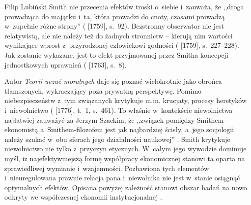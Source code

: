 \begin{artplenv}{Filip Lubiński}
Smith nie przecenia efektów troski o~siebie i~zauważa, że ,,droga prowadząca do majątku i~ta, która prowadzi do
cnoty, czasami prowadzą w~zupełnie różne strony''
(\cite{smith_teoria_1989} [1759], s.~92).
Bezstronny
obserwator nie jest relatywistą, ale nie należy też do żadnych stronnictw -- kierują nim wartości wynikające
wprost z~przyrodzonej człowiekowi godności
(\cite{smith_teoria_1989} [1759], s.~227--228).
Jak zostanie wykazane,
jest to efekt przyjmowanej przez Smitha koncepcji jednostkowych uprawnień
(\cite{smith_lectures_1982} [1763], s.~8).

Autor \textit{Teorii uczuć moralnych} daje się poznać wielokrotnie jako obrońca tłamszonych, wykraczający poza
prywatną perspektywę. Pomimo niebezpieczeństw z~tym związanych krytykuje m.in. krucjaty, procesy
heretyków i~niewolnictwo
(\cite{smith_badania_2007} [1776], t.~1, s.~461).
To właśnie w~kontekście niewolnictwa
najłatwiej zauważyć za Jerzym Szackim, że ,,związek pomiędzy Smithem-ekonomistą a~Smithem-filozofem jest jak
najbardziej ścisły, a~jego socjologii należy szukać w~obu sferach jego działalności naukowej''
\parencite[s.~124]{szacki_historia_1983}.
Smith krytykuje niewolnictwo nie tylko z~przyczyn etycznych. W~całym
jego wywodzie dominuje myśl, iż najefektywniejszą formę współpracy ekonomicznej stanowi ta oparta na sprawiedliwej
wymianie i~wzajemności. Pozbawiona tych elementów i~nieuregulowana prawnie relacja pana i~niewolnika nie jest w~stanie
osiągnąć optymalnych efektów. Opisana powyżej zależność stanowi obszar badań na nowo odkryty we współczesnej ekonomii
instytucjonalnej
\parencite{acemoglu_dlaczego_2014}.


\end{artplenv}
